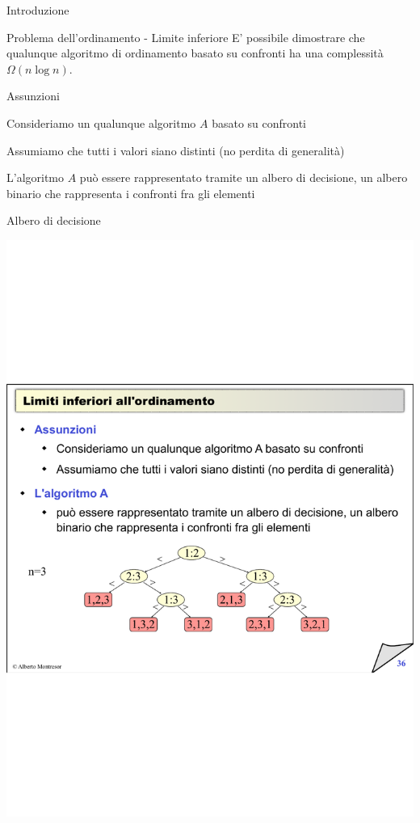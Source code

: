 \begin{frame}{Introduzione}

\begin{block}{Problema dell'ordinamento - Limite inferiore}
E' possibile dimostrare che qualunque algoritmo di ordinamento \alert{basato su confronti} ha una complessità 
$\Omega(n \log n)$.
\end{block}

\begin{block}{Assunzioni}
\BI
\item Consideriamo un qualunque algoritmo $A$ basato su confronti
\item Assumiamo che tutti i valori siano distinti (no perdita di generalità)
\item L'algoritmo $A$  può essere rappresentato tramite un \alert{albero di decisione}, un albero binario che rappresenta i confronti fra gli elementi
\EI
\end{block}

\end{frame}%

\begin{frame}{Albero di decisione}
	
\includegraphics[width=\textwidth]{albero-ordinamento.pdf}	
	
\end{frame}%

